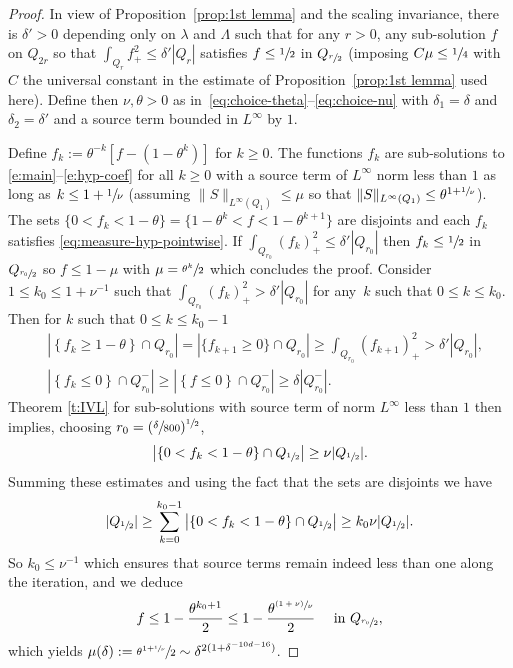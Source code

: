 \documentclass[11pt]{article}
\numberwithin{equation}{section}\let\oldbigcup\bigcup
\newcommand{\psfrac}[2]{\sfrac{(#1)}{#2}}
\theoremstyle{definition}
\theoremstyle{remark}
\begin{document}
\begin{proof}
In view of Proposition~\ref{prop:1st lemma} and the scaling
invariance, there is $\delta'>0$ depending only on $\lambda$
and $\Lambda$ such that for any $r>0$, any sub-solution $f$ on
$Q_{2r}$ so that $\int_{Q_{r}} f_{+}^2 \leq \delta' |Q_{r}|$
satisfies $f\leq \sfrac{1}{2}$ in $Q_{\sfrac{r}{2}}$ (imposing
$C\mu\le \sfrac{1}{4}$ with $C$ the universal constant in the
estimate of Proposition~\ref{prop:1st lemma} used here). Define
then $\nu, \theta>0$ as
in~\eqref{eq:choice-theta}--\eqref{eq:choice-nu} with
$\delta_1=\delta$ and $\delta_2=\delta'$ and a source term
bounded in $L^\infty$ by $1$.

Define $f_k := \theta^{-k}[f-(1-\theta^k)]$ for $k \ge 0$. The
functions $f_{k}$ are sub-solutions to
\eqref{e:main}--\eqref{e:hyp-coef} for all $k \ge 0$ with a
source term of $L^{\infty}$ norm less than $1$ as long as
$k\leq 1+\sfrac{1}{\nu}$ (assuming
$\| S\|_{L^{\infty}(Q_1)}\le \mu$ so that
$\| S\|_{L^{\infty}(Q_1)} \le \theta^{1+\sfrac{1}{\nu}}$). The
sets $\{ 0<f_{k}<1-\theta\}= \{1-\theta^k<f<1-\theta^{k+1}\}$
are disjoints and each $f_k$ satisfies
\eqref{eq:measure-hyp-pointwise}. If
$\int_{Q_{r_0}} (f_k)_{+}^2 \leq \delta' |Q_{r_0}|$ then
$f_k\leq \sfrac{1}{2}$ in $Q_{\sfrac{r_0}{2}}$ so $f\le 1-\mu$
with $\mu = \sfrac{\theta^k}{2}$ which concludes the proof.
Consider $ 1\leq k_0 \leq 1+\nu^{-1}$ such that
$\int_{Q_{r_0}} (f_{k})_{+}^2 > \delta'|Q_{r_0}|$ for any~$k$ such that $0\leq k\leq k_0$. Then for $k$ such that $0\leq k\leq k_0-1$
\begin{align*}
& \left|\left\{ f_{k}\geq 1-\theta \right\} \cap
Q_{r_0}\right| = \left|\{f_{k+1}\geq
0\} \cap Q_{r_0} \right| \geq \int_{Q_{r_0} } (f_{k+1})_{+}^2
> \delta' |Q_{r_0}|, \\
& \left|\left\{f_{k}\leq 0\right\} \cap Q_{r_0}^{-}\right|
\geq \left|\left\{f\leq 0 \right\}\cap Q_{r_0}^{-}\right|
\geq \delta |Q_{r_0}^-|.
\end{align*}
Theorem \ref{t:IVL} for sub-solutions with source term of norm
$L^{\infty}$ less than $1$ then implies, choosing $r_0 =
(\sfrac{\delta}{800})^{\sfrac12}$,
\[
\left| \left\{ 0<f_{k}< 1-\theta \right\}\cap Q_{\sfrac12}\right|
\geq \nu |Q_{\sfrac12}|.
\]
Summing these estimates and using the fact that the sets are
disjoints we have
\[
|Q_{\sfrac12}|\geq \sum_{k=0}^{k_0-1}
\left| \left\{ 0<f_{k}< 1-\theta \right\}\cap
Q_{\sfrac12} \right| \geq k_0 \nu |Q_{\sfrac12}|.
\]
So $k_0 \leq \nu^{-1}$ which ensures that source terms remain
indeed less than one along the iteration, and we deduce
\begin{align*}
f \leq 1-\frac{\theta^{k_0+1}}{2}\leq
1-\frac{\theta^{\psfrac{1+\nu}{\nu}}}{2} \quad \mbox{ in }
Q_{\sfrac{r_0}{2}},
\end{align*}
which yields
$\mu(\delta) := \sfrac{\theta^{1+\sfrac{1}{\nu}}}{2} \sim
\delta^{2 (1+\delta^{-10d-16})}$.
\end{proof}
\end{document}

